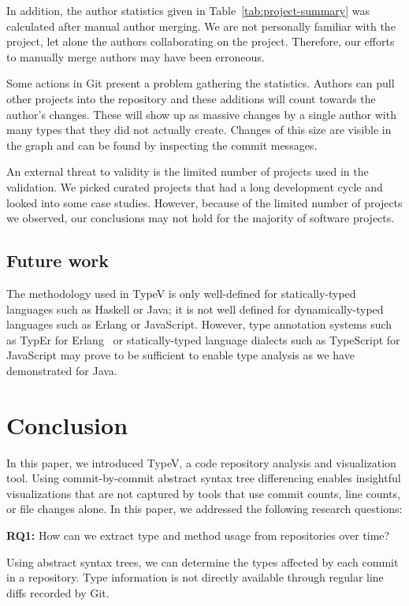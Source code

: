 In addition, the author statistics given in Table~\ref{tab:project-summary} was calculated after manual author merging. We are not personally familiar with the project, let alone the authors collaborating on the project. Therefore, our efforts to manually merge authors may have been erroneous.

Some actions in Git present a problem gathering the statistics. Authors can pull other projects into the repository and these additions will count towards the author's changes. These will show up as massive changes by a single author with many types that they did not actually create. Changes of this size are visible in the graph and can be found by inspecting the commit messages.

An external threat to validity is the limited number of projects used in the validation. We picked curated projects that had a long development cycle and looked into some case studies. However, because of the limited number of projects we observed, our conclusions may not hold for the majority of software projects.

\subsection{Future work}

The methodology used in TypeV is only well-defined for statically-typed languages such as Haskell or Java; it is not well defined for dynamically-typed languages such as Erlang or JavaScript. However, type annotation systems such as TypEr for Erlang~\cite{typer} or statically-typed language dialects such as TypeScript for JavaScript may prove to be sufficient to enable type analysis as we have demonstrated for Java.

\section{Conclusion}

In this paper, we introduced TypeV, a code repository analysis and visualization tool. Using commit-by-commit abstract syntax tree differencing enables insightful visualizations that are not captured by tools that use commit counts, line counts, or file changes alone. In this paper, we addressed the following research questions:

\textbf{RQ1:} How can we extract type and method usage from repositories over time?

\begin{framed}
\noindent
Using abstract syntax trees, we can determine the types affected by each commit in a repository. Type information is not directly available through regular line diffs recorded by Git.
\end{framed}

